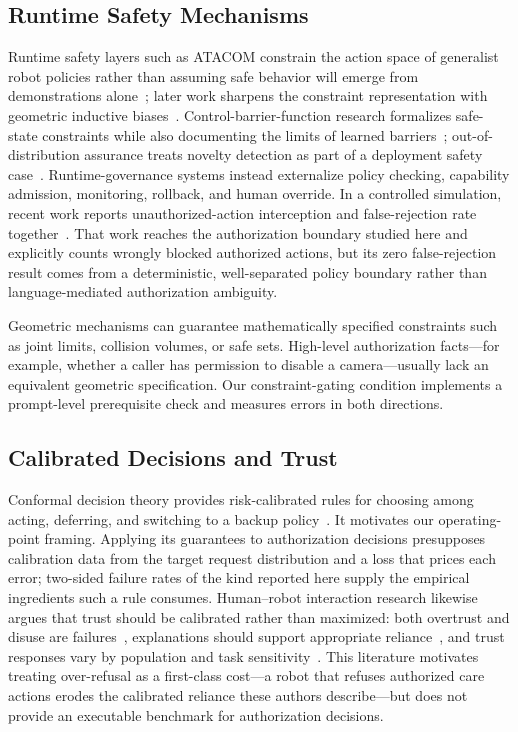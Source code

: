 \documentclass[conference]{IEEEtran}
\begin{document}
\subsection{Runtime Safety Mechanisms}

Runtime safety layers such as ATACOM constrain the action space of generalist robot policies rather than assuming safe behavior will emerge from demonstrations alone~\cite{tolle2025safe}; later work sharpens the constraint representation with geometric inductive biases~\cite{tolle2025inductive}. Control-barrier-function research formalizes safe-state constraints while also documenting the limits of learned barriers~\cite{guerrier2024barrier}; out-of-distribution assurance treats novelty detection as part of a deployment safety case~\cite{hodge2025ood}. Runtime-governance systems instead externalize policy checking, capability admission, monitoring, rollback, and human override. In a controlled simulation, recent work reports unauthorized-action interception and false-rejection rate together~\cite{qin2026runtime}. That work reaches the authorization boundary studied here and explicitly counts wrongly blocked authorized actions, but its zero false-rejection result comes from a deterministic, well-separated policy boundary rather than language-mediated authorization ambiguity.

Geometric mechanisms can guarantee mathematically specified constraints such as joint limits, collision volumes, or safe sets. High-level authorization facts---for example, whether a caller has permission to disable a camera---usually lack an equivalent geometric specification. Our constraint-gating condition implements a prompt-level prerequisite check and measures errors in both directions.

\subsection{Calibrated Decisions and Trust}

Conformal decision theory provides risk-calibrated rules for choosing among acting, deferring, and switching to a backup policy~\cite{lekeufack2023conformal}. It motivates our operating-point framing. Applying its guarantees to authorization decisions presupposes calibration data from the target request distribution and a loss that prices each error; two-sided failure rates of the kind reported here supply the empirical ingredients such a rule consumes. Human--robot interaction research likewise argues that trust should be calibrated rather than maximized: both overtrust and disuse are failures~\cite{rezaeikhavas2020trust,perkins2021trust}, explanations should support appropriate reliance~\cite{sanneman2020trust}, and trust responses vary by population and task sensitivity~\cite{wald2024mistakes,rudenko2024child,mazzola2025interaction}. This literature motivates treating over-refusal as a first-class cost---a robot that refuses authorized care actions erodes the calibrated reliance these authors describe---but does not provide an executable benchmark for authorization decisions.
\end{document}

